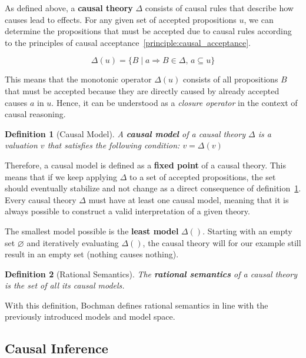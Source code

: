 \documentclass[seminar,palatino,english]{AIGpaper}
\begin{document}
As defined above, a \textbf{causal theory} $ \Delta $ consists of causal rules that describe how causes lead to effects. For any given set of accepted propositions $ u $, we can determine the propositions that must be accepted due to causal rules according to the principles of causal acceptance~\ref{principle:causal_acceptance}.

\begin{equation}
    \Delta(u) = \{ B \mid a \Rightarrow B \in \Delta, \, a \subseteq u \}
\end{equation}

This means that the monotonic operator $ \Delta(u) $ consists of all propositions $ B $ that must be accepted because they are directly caused by already accepted causes $ a $ in $ u $. Hence, it can be understood as a \emph{closure operator} in the context of causal reasoning.

\newtheorem{definition}{Definition}
\begin{definition}[Causal Model]\label{def:causal_model}
A \textbf{causal model} of a causal theory $ \Delta $ is a valuation $ v $ that satisfies the following condition: $ v = \Delta(v) $
\end{definition}


Therefore, a causal model is defined as a \textbf{fixed point} of a causal theory. This means that if we keep applying $ \Delta $ to a set of accepted propositions, the set should eventually stabilize and not change as a direct consequence of definition~\ref{def:causal_model}. Every causal theory $ \Delta $ must have at least one causal model, meaning that it is always possible to construct a valid interpretation of a given theory.

The smallest model possible is the \textbf{least model} $\Delta()$. Starting with an empty set $\varnothing$ and iteratively evaluating $ \Delta() $, the causal theory will for our example still result in an empty set (\glqq{}nothing causes nothing\grqq{}).

\begin{definition}[Rational Semantics]\label{def:rational_semantics}
The \textbf{rational semantics} of a causal theory is the set of all its causal models.
\end{definition}

With this definition, Bochman defines rational semantics in line with the previously introduced models and model space.


\subsection{Causal Inference}
\end{document}
